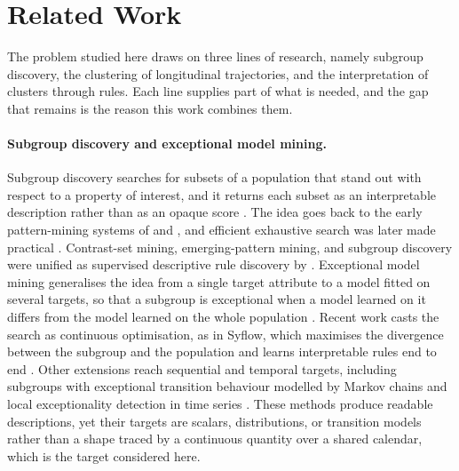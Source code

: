 \section{Related Work}
\label{sec:related}

The problem studied here draws on three lines of research, namely subgroup discovery, the clustering of longitudinal trajectories, and the interpretation of clusters through rules. Each line supplies part of what is needed, and the gap that remains is the reason this work combines them.

\paragraph{Subgroup discovery and exceptional model mining.} Subgroup discovery searches for subsets of a population that stand out with respect to a property of interest, and it returns each subset as an interpretable description rather than as an opaque score \citep{atzmueller2015subgroup,herrera2011overview}. The idea goes back to the early pattern-mining systems of \citet{klosgen1996explora} and \citet{wrobel1997midos}, and efficient exhaustive search was later made practical \citep{atzmueller2006sdmap}. Contrast-set mining, emerging-pattern mining, and subgroup discovery were unified as supervised descriptive rule discovery by \citet{novak2009supervised}. Exceptional model mining generalises the idea from a single target attribute to a model fitted on several targets, so that a subgroup is exceptional when a model learned on it differs from the model learned on the whole population \citep{leman2008emm,duivesteijn2016emm}. Recent work casts the search as continuous optimisation, as in Syflow, which maximises the divergence between the subgroup and the population and learns interpretable rules end to end \citep{xu2024syflow}. Other extensions reach sequential and temporal targets, including subgroups with exceptional transition behaviour modelled by Markov chains \citep{lemmerich2016transition} and local exceptionality detection in time series \citep{knobbe2008local}. These methods produce readable descriptions, yet their targets are scalars, distributions, or transition models rather than a shape traced by a continuous quantity over a shared calendar, which is the target considered here.

